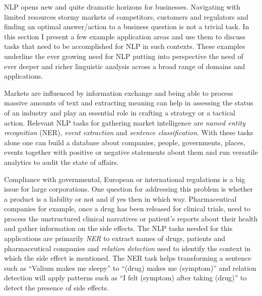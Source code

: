    NLP opens new and quite dramatic horizons for businesses. Navigating with limited resources stormy markets of competitors, customers and regulators and finding an optimal answer/action to a business question is not a trivial task. In this section I present a few example application areas and use them to discuss tasks that need to be accomplished for NLP in such contexts. These examples underline the ever growing need for NLP putting into perspective the need of ever deeper and richer linguistic analysis across a broad range of domains and applications.
    
    Markets are influenced by information exchange and being able to process massive amounts of text and extracting meaning can help in assessing the status of an industry and play an essential role in crafting a strategy or a tactical action. 
    Relevant NLP tasks for gathering market intelligence are \textit{named entity recognition} (NER), \textit{event extraction} and \textit{sentence classification}. With these tasks alone one can build a database about companies, people, governments, places, events together with positive or negative statements about them and run versatile analytics to audit the state of affairs.
    
    Compliance with governmental, European or international regulations is a big issue for large corporations. One question for addressing this problem is whether a product is a liability or not and if yes then in which way. Pharmaceutical companies for example, once a drug has been released for clinical trials, need to process the unstructured clinical narratives or patient's reports about their health and gather information on the side effects. The NLP tasks needed for this applications are primarily \textit{NER} to extract names of drugs, patients and pharmaceutical companies and \textit{relation detection} used to identify the context in which the side effect is mentioned. The NER task helps transforming a sentence such as ``Valium makes me sleepy'' to ``(drug) makes me (symptom)'' and relation detection will apply patterns such as ``I felt (symptom) after taking (drug)'' to detect the presence of side effects.
    
